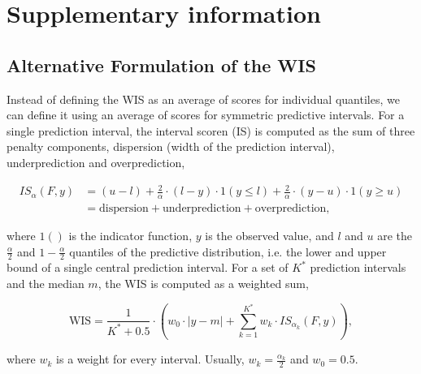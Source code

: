 \documentclass{article}
\begin{document}
\newpage

\appendix
\section{Supplementary information}

\subsection{Alternative Formulation of the WIS}
\label{sec:alternative-wis}

Instead of defining the WIS as an average of scores for individual quantiles, we can define it using an average of scores for symmetric predictive intervals. For a single prediction interval, the interval scoren (IS) is computed as the sum of three penalty components, dispersion (width of the prediction interval), underprediction and overprediction,  
%
\begin{linenomath*}
\begin{align*}
 IS_\alpha(F,y) &= (u-l) + \frac{2}{\alpha} \cdot (l-y) \cdot 1(y \leq l) + \frac{2}{\alpha} \cdot (y-u) \cdot 1(y \geq u) \\
 &= \text{dispersion} + \text{underprediction} + \text{overprediction},    
\end{align*}
\end{linenomath*}
%
where $1()$ is the indicator function, $y$ is the observed value, and $l$ and $u$ are the $\frac{\alpha}{2}$ and $1 - \frac{\alpha}{2}$ quantiles of the predictive distribution, i.e. the lower and upper bound of a single central prediction interval. For a set of $K^*$ prediction intervals and the median $m$, the WIS is computed as a weighted sum, 
\begin{linenomath*}
\begin{equation*}
\text{WIS} = \frac{1}{K^* + 0.5} \cdot \left(w_0 \cdot |y - m| + \sum_{k = 1}^{K^*} w_k \cdot IS_{\alpha_{k}}(F, y)\right),    
\end{equation*} 
\end{linenomath*}
where $w_k$ is a weight for every interval. Usually, $w_k = \frac{\alpha_k}{2}$ and $w_0 = 0.5$. 
\end{document}
